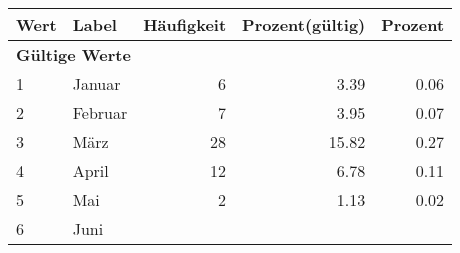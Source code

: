      \begin{longtable}{lXrrr}
     \toprule
     \textbf{Wert} & \textbf{Label} & \textbf{Häufigkeit} & \textbf{Prozent(gültig)} & \textbf{Prozent} \\
     \endhead
     \midrule
     \multicolumn{5}{l}{\textbf{Gültige Werte}}\\

     1 &
     \multicolumn{1}{X}{ Januar   } &


       \num{6} &
       \num[round-mode=places,round-precision=2]{3,39} &
         \num[round-mode=places,round-precision=2]{0,06} \\

     2 &
     \multicolumn{1}{X}{ Februar   } &


       \num{7} &
       \num[round-mode=places,round-precision=2]{3,95} &
         \num[round-mode=places,round-precision=2]{0,07} \\

     3 &
     \multicolumn{1}{X}{ März   } &


       \num{28} &
       \num[round-mode=places,round-precision=2]{15,82} &
         \num[round-mode=places,round-precision=2]{0,27} \\

     4 &
     \multicolumn{1}{X}{ April   } &


       \num{12} &
       \num[round-mode=places,round-precision=2]{6,78} &
         \num[round-mode=places,round-precision=2]{0,11} \\

     5 &
     \multicolumn{1}{X}{ Mai   } &


       \num{2} &
       \num[round-mode=places,round-precision=2]{1,13} &
         \num[round-mode=places,round-precision=2]{0,02} \\

     6 &
     \multicolumn{1}{X}{ Juni   } &



\end{longtable}
